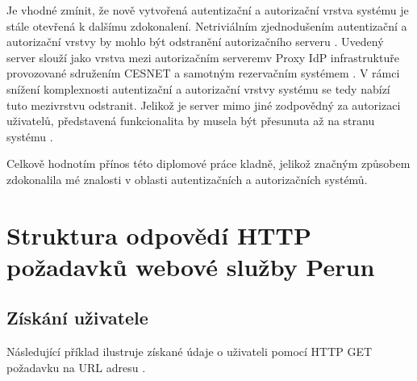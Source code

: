\documentclass[
  printed, %
  twoside, %
  table,   %
  nolof,     %
  nolot,     %
]{fithesis3}
\begin{document}
\par

Je vhodné zmínit, že nově vytvořená autentizační a autorizační vrstva systému  je stále otevřená k dalšímu zdokonalení. Netriviálním zjednodušením autentizační a autorizační vrstvy by mohlo být odstranění autorizačního serveru . Uvedený server slouží jako vrstva mezi autorizačním serverem\break v Proxy IdP infrastruktuře provozované sdružením CESNET a samotným rezervačním systémem . V rámci snížení komplexnosti autentizační a autorizační vrstvy systému  se tedy nabízí tuto mezivrstvu odstranit. Jelikož je server  mimo jiné zodpovědný za autorizaci uživatelů, představená funkcionalita by musela být přesunuta až na stranu systému . 

\par 

Celkově hodnotím přínos této diplomové práce kladně, jelikož značným způsobem zdokonalila mé znalosti v oblasti autentizačních a autorizačních systémů.

\printbibliography[title={Literatura}]

\appendix %


\chapter{Struktura odpovědí HTTP požadavků webové služby Perun}

\section{Získání uživatele}
\label{table:perunws:user}
Následující příklad ilustruje získané údaje o uživateli pomocí HTTP GET požadavku na URL adresu .
\end{document}
